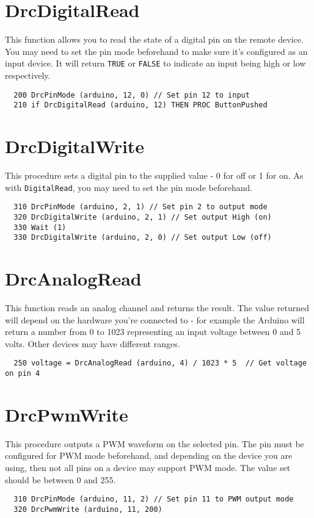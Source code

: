 \section{DrcDigitalRead}
This function allows you to read the state of a digital pin on the remote
device. You may need to set the pin mode beforehand to make sure it's
configured as an input device. It will return {\tt TRUE} or {\tt FALSE}
to indicate an input being high or low respectively.
\begin{verbatim}
  200 DrcPinMode (arduino, 12, 0) // Set pin 12 to input
  210 if DrcDigitalRead (arduino, 12) THEN PROC ButtonPushed
\end{verbatim}

\section{DrcDigitalWrite}
This procedure sets a digital pin to the supplied value - 0 for off or
1 for on. As with {\tt DigitalRead}, you may need to set the pin mode
beforehand.
\begin{verbatim}
  310 DrcPinMode (arduino, 2, 1) // Set pin 2 to output mode
  320 DrcDigitalWrite (arduino, 2, 1) // Set output High (on)
  330 Wait (1)
  330 DrcDigitalWrite (arduino, 2, 0) // Set output Low (off)
\end{verbatim} 

\section{DrcAnalogRead}
This function reads an analog channel and returns the result. The value
returned will depend on the hardware you're connected to - for example
the Arduino will return a number from 0 to 1023 representing an input
voltage between 0 and 5 volts. Other devices may have different ranges.
\begin{verbatim}
  250 voltage = DrcAnalogRead (arduino, 4) / 1023 * 5  // Get voltage on pin 4
\end{verbatim}

\section{DrcPwmWrite}
This procedure outputs a PWM waveform on the selected pin. The pin must
be configured for PWM mode beforehand, and depending on the device you
are using, then not all pins on a device may support PWM mode. The value
set should be between 0 and 255.
\begin{verbatim}
  310 DrcPinMode (arduino, 11, 2) // Set pin 11 to PWM output mode
  320 DrcPwmWrite (arduino, 11, 200)
\end{verbatim} 
